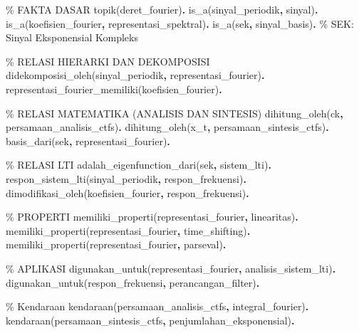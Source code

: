 \documentclass[
  letterpaper,
  DIV=11,
  numbers=noendperiod]{scrreprt}
\newenvironment{Shaded}{\begin{snugshade}}{\end{snugshade}}
\newcommand{\CommentTok}[1]{\textcolor[rgb]{0.37,0.37,0.37}{#1}}
\newcommand{\KeywordTok}[1]{\textcolor[rgb]{0.00,0.23,0.31}{\textbf{#1}}}
\newcommand{\NormalTok}[1]{\textcolor[rgb]{0.00,0.23,0.31}{#1}}
\begin{document}
\begin{Shaded}
\begin{Highlighting}[]
\CommentTok{\% FAKTA DASAR}
\NormalTok{topik(deret\_fourier)}\KeywordTok{.}
\NormalTok{is\_a(sinyal\_periodik}\KeywordTok{,}\NormalTok{ sinyal)}\KeywordTok{.}
\NormalTok{is\_a(koefisien\_fourier}\KeywordTok{,}\NormalTok{ representasi\_spektral)}\KeywordTok{.}
\NormalTok{is\_a(sek}\KeywordTok{,}\NormalTok{ sinyal\_basis)}\KeywordTok{.} \CommentTok{\% SEK: Sinyal Eksponensial Kompleks}

\CommentTok{\% RELASI HIERARKI DAN DEKOMPOSISI}
\NormalTok{didekomposisi\_oleh(sinyal\_periodik}\KeywordTok{,}\NormalTok{ representasi\_fourier)}\KeywordTok{.}
\NormalTok{representasi\_fourier\_memiliki(koefisien\_fourier)}\KeywordTok{.}

\CommentTok{\% RELASI MATEMATIKA (ANALISIS DAN SINTESIS)}
\NormalTok{dihitung\_oleh(ck}\KeywordTok{,}\NormalTok{ persamaan\_analisis\_ctfs)}\KeywordTok{.}
\NormalTok{dihitung\_oleh(x\_t}\KeywordTok{,}\NormalTok{ persamaan\_sintesis\_ctfs)}\KeywordTok{.}
\NormalTok{basis\_dari(sek}\KeywordTok{,}\NormalTok{ representasi\_fourier)}\KeywordTok{.}

\CommentTok{\% RELASI LTI}
\NormalTok{adalah\_eigenfunction\_dari(sek}\KeywordTok{,}\NormalTok{ sistem\_lti)}\KeywordTok{.}
\NormalTok{respon\_sistem\_lti(sinyal\_periodik}\KeywordTok{,}\NormalTok{ respon\_frekuensi)}\KeywordTok{.}
\NormalTok{dimodifikasi\_oleh(koefisien\_fourier}\KeywordTok{,}\NormalTok{ respon\_frekuensi)}\KeywordTok{.}

\CommentTok{\% PROPERTI}
\NormalTok{memiliki\_properti(representasi\_fourier}\KeywordTok{,}\NormalTok{ linearitas)}\KeywordTok{.}
\NormalTok{memiliki\_properti(representasi\_fourier}\KeywordTok{,}\NormalTok{ time\_shifting)}\KeywordTok{.}
\NormalTok{memiliki\_properti(representasi\_fourier}\KeywordTok{,}\NormalTok{ parseval)}\KeywordTok{.}

\CommentTok{\% APLIKASI}
\NormalTok{digunakan\_untuk(representasi\_fourier}\KeywordTok{,}\NormalTok{ analisis\_sistem\_lti)}\KeywordTok{.}
\NormalTok{digunakan\_untuk(respon\_frekuensi}\KeywordTok{,}\NormalTok{ perancangan\_filter)}\KeywordTok{.}

\CommentTok{\% Kendaraan}
\NormalTok{kendaraan(persamaan\_analisis\_ctfs}\KeywordTok{,}\NormalTok{ integral\_fourier)}\KeywordTok{.}
\NormalTok{kendaraan(persamaan\_sintesis\_ctfs}\KeywordTok{,}\NormalTok{ penjumlahan\_eksponensial)}\KeywordTok{.}
\end{Highlighting}
\end{Shaded}
\end{document}
